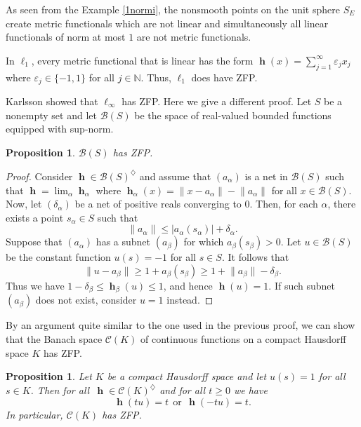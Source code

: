 \documentclass[a4paper,12pt]{article}
\newtheorem{proposition}[theorem]{Proposition}
\theoremstyle{definition}
\numberwithin{equation}{section}
\newcommand{\abs}[1]{\lvert#1\rvert} %
\newcommand{\norm}[1]{\lVert#1\rVert} %
\newcommand{\N}{\mathbb{N}}  %
\numberwithin{equation}{section}
\DeclareMathOperator{\h}{\mathbf{h}} %
\begin{document}
As seen from the Example \ref{1normi}, the nonsmooth points on the 
unit sphere $S_E$ create metric functionals which are not linear 
and simultaneously all linear functionals of norm at most $1$
are not metric functionals. 

In $\ell_1$, every metric functional that is linear has the form 
$\h(x) =  \sum_{j=1} ^\infty  \varepsilon_j x_j$ where 
$\varepsilon_j \in \{ -1, 1 \}$ for all $j\in \N$. Thus, $\ell_1$ 
does have ZFP.    

Karlsson showed \cite[Prop.~22]{Karlsson2023} that $\ell_\infty$ 
has ZFP. Here we give a different proof. Let $S$ be a nonempty 
set and let $\mathcal{B}(S)$ be the space of real-valued bounded 
functions equipped with sup-norm.
\begin{proposition}
    $\mathcal{B}(S)$ has ZFP.
\end{proposition}

\begin{proof}
Consider $\h\in \mathcal{B}(S)^\diamondsuit$ 
and assume that $(a_\alpha)$ is a net in 
$\mathcal{B}(S)$ such that 
$\h=\lim_\alpha \h_\alpha$ where 
$\h_\alpha(x)=\norm{x-a_\alpha}-\norm{a_\alpha}$ 
for all $x\in \mathcal{B}(S)$. Now, let 
$(\delta_\alpha)$ be a net of positive reals 
converging to $0$. Then, for each $\alpha$, 
there exists a point $s_\alpha\in S$ such that
$$
\norm{a_\alpha} \leq \abs{a_\alpha(s_\alpha)} 
            + \delta_\alpha.
$$
Suppose that $(a_\alpha)$ has a subnet 
$(a_\beta)$ for which $a_\beta(s_\beta) > 0$. 
Let $u\in \mathcal{B}(S)$ be the constant 
function $u(s)=-1$ for all $s\in S$. It follows 
that
$$
\norm{u-a_\beta} \geq 1 + a_\beta(s_\beta) 
        \geq 1 + \norm{a_\beta} -\delta_\beta.
$$
Thus we have $1 - \delta_\beta \leq \h_\beta(u) \leq 1$, 
and hence $\h(u)=1$. If such subnet $(a_\beta)$ 
does not exist, consider $u=1$ instead.
\end{proof}

By an argument quite similar to the one 
used in the previous proof, we can show that
the Banach space $\mathcal{C}(K)$ of 
continuous functions on a compact Hausdorff
space $K$ has ZFP.

\begin{proposition}
Let $K$ be a compact Hausdorff space and let 
$u(s)=1$ for all $s\in K$. Then for all 
$\,\h \in \mathcal{C}(K)^\diamondsuit$ and 
for all $t \geq 0$ we have
$$
        \h(tu) = t\ \ \text{or}\ \ \h(-tu) = t.
$$ 
In particular, $\mathcal{C}(K)$ has ZFP.
\end{proposition}
\end{document}
